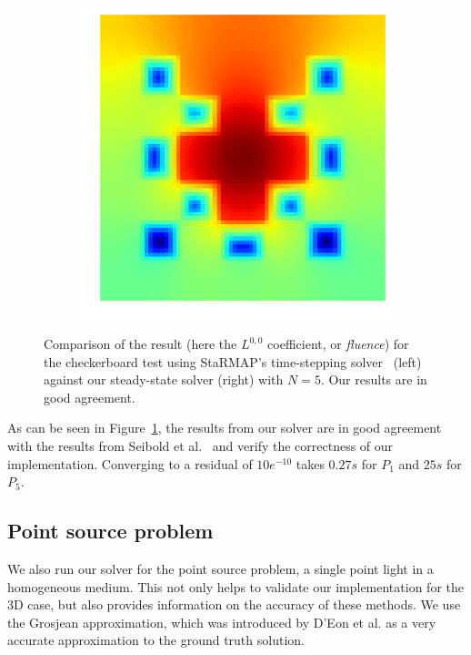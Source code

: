 \documentclass{egpubl}
\newcommand{\icaption}[1]{\caption{#1}}
\newcommand{\nocontentsline}[3]{}
\newcommand{\tocless}[2]{\bgroup\let\addcontentsline=\nocontentsline#1{#2}\egroup}
\begin{document}
\begin{figure}[h]
\begin{subfigure}{0.49\columnwidth}
\includegraphics[width=\columnwidth]{checkerboard2d_p1_neumann_staggered.png}
\end{subfigure}%
\vspace{-0.1in}
\icaption{Comparison of the result (here the $L^{0,0}$ coefficient, or \emph{fluence}) for the checkerboard test using \textsf{StaRMAP}'s time-stepping solver~\cite{Seibold14} (left) against our steady-state solver (right) with $N=5$. Our results are in good agreement.}
\label{fig:vs_starmap}
\end{figure}

As can be seen in Figure~\ref{fig:vs_starmap}, the results from our solver are in good agreement with the results from Seibold et al.~\cite{Seibold14} and verify the correctness of our implementation. Converging to a residual of $10e^{-10}$ takes $0.27s$ for $P_1$ and $25s$ for $P_5$.



\tocless\subsection{Point source problem}

We also run our solver for the point source problem, a single point light in a homogeneous medium. This not only helps to validate our implementation for the 3D case, but also provides information on the accuracy of these methods. We use the Grosjean approximation, which was introduced by D'Eon et al.\cite{dEon11} as a very accurate approximation to the ground truth solution.
\end{document}
